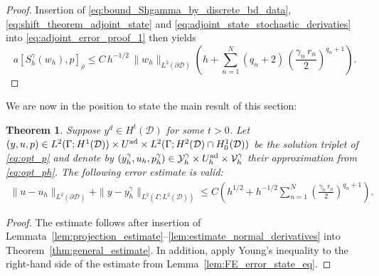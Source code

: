 \documentclass[a4paper,10pt]{article}
\newcommand{\cD}{{\mathcal{D}}}
\newtheorem{theorem}{Theorem}[section]
\numberwithin{theorem}{section}
\begin{document}
\begin{proof}
Insertion of \eqref{eq:bound_Shgamma_by_discrete_bd_data}, \eqref{eq:shift_theorem_adjoint_state} and \eqref{eq:adjoint_state_stochastic_derivaties} into \eqref{eq:adjoint_error_proof_1} then yields
\begin{equation*}
  a[S_h^\gamma (w_h), p]_\rho \le C\,h^{-1/2}\,\|w_h\|_{L^2(\partial\cD)} \left(h
    + \sum_{n=1}^N (q_n+2)\,\left(\frac{\gamma_n\,r_n}{2}\right)^{q_n+1}\right).
\end{equation*}
\end{proof}

We are now in the position to state the main result of this section:
\begin{theorem}
\label{thm:final_estimate}
Suppose $y^d\in H^t(\cD)$ for some $t>0$.
Let $(y,u,p)\in L^2(\Gamma;H^1(\cD))\times U^{\textup{ad}} \times L^2(\Gamma;H^2(\cD)\cap H^1_0(\cD))$  be the solution triplet of \eqref{eq:opt_p} and denote by $(y_h^\gamma,u_h,p_h^\gamma)\in \mathcal Y_h^\gamma\times U_h^{\textup{ad}} \times \mathcal V_h^\gamma$ their approximation from \eqref{eq:opt_ph}. The following error estimate is valid:
\begin{align*}
  \|u-u_h\|_{L^2(\partial\cD)} + \|y-y_h^\gamma\|_{L^2(\Gamma;L^2(\cD))}\le C\left(h^{1/2}
  +  h^{-1/2}\sum \limits_{n=1}^N \left(\frac{\gamma_n\,r_n}{2}\right)^{q_n+1}
  \right).
\end{align*}
\end{theorem}
\begin{proof}
	The estimate follows after insertion of Lemmata~\ref{lem:projection_estimate}--\ref{lem:estimate_normal_derivatives} into Theorem~\ref{thm:general_estimate}. In addition, apply Young's inequality to the right-hand side of the estimate from Lemma~\ref{lem:FE_error_state_eq}.
\end{proof}
\end{document}
